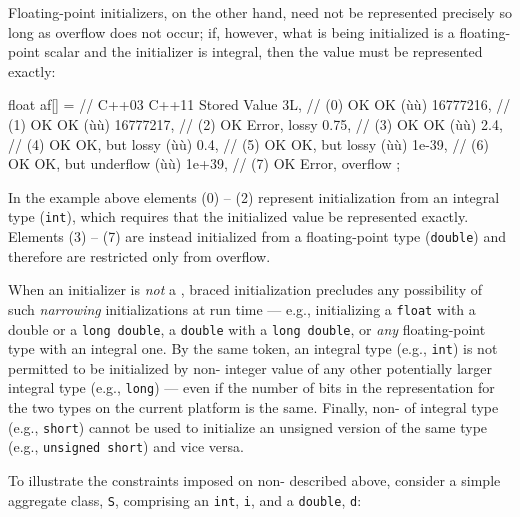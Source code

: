 Floating-point initializers, on the other hand, need not be represented
precisely so long as overflow does not occur; if, however, what is being
initialized is a floating-point scalar and the initializer is integral,
then the value must be represented exactly:

\begin{emcppslisting}[emcppserrorlines={5,10}]
float af[] =     //       C++03   C++11                  Stored Value
{
     3L,        // (0)     OK     OK                   (ù{}ù)
     16777216,  // (1)     OK     OK                   (ù{}ù)
     16777217,  // (2)     OK     Error, lossy
     0.75,      // (3)     OK     OK                   (ù{}ù)
     2.4,       // (4)     OK     OK, but lossy        (ù{}ù)
     0.4,       // (5)     OK     OK, but lossy        (ù{}ù)
     1e-39,     // (6)     OK     OK, but underflow    (ù{}ù)
     1e+39,     // (7)     OK     Error, overflow
};
\end{emcppslisting}
    

\noindent In the example above elements (0) -- (2) represent initialization from
an integral type (\lstinline!int!), which requires that the initialized
value be represented exactly. Elements (3) -- (7) are instead
initialized from a floating-point type (\lstinline!double!) and therefore
are restricted only from overflow.

When an initializer is \emph{not} a , braced
initialization precludes any possibility of such \emph{narrowing}
initializations at run time --- e.g., initializing a \lstinline!float! with
a double or a \lstinline!long!~\lstinline!double!, a \lstinline!double! with a
\lstinline!long!~\lstinline!double!, or \emph{any} floating-point type with an
integral one. By the same token, an integral type (e.g., \lstinline!int!)
is not permitted to be initialized by non-
integer value of any other potentially larger integral type (e.g.,
\lstinline!long!) --- even if the number of bits in the representation for
the two types on the current platform is the same. Finally,
non- of integral type (e.g., \lstinline!short!)
cannot be used to initialize an unsigned version of the same type (e.g.,
\lstinline!unsigned!~\lstinline!short!) and vice versa.

To illustrate the constraints imposed on
non- described above, consider a simple
aggregate class, \lstinline!S!, comprising an \lstinline!int!, \lstinline!i!, and
a \lstinline!double!, \lstinline!d!:

